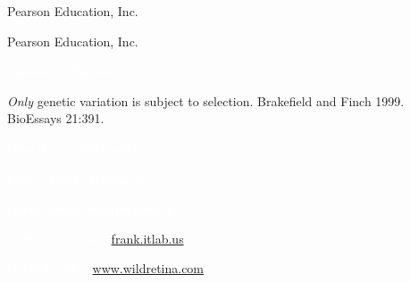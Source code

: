 \documentclass[t]{beamer}
\begin{document}
%
{
\begin{frame}[b]

\tiny\textcopyright Pearson Education, Inc.
\end{frame}
}
%
{
\begin{frame}[b]

\tiny\textcopyright Pearson Education, Inc.
\end{frame}
}
%
%
{
\begin{frame}
\end{frame}
}
%
{
\begin{frame}[plain]
\end{frame}
}

{
\begin{frame}[b,plain]
\hfill\textcolor{white}{\tiny \textcopyright Entomart, Wikimedia}
\end{frame}
}
%
{
\begin{frame}[b,plain]{\textit{Only} genetic variation is subject to selection.}
\hfill\tiny Brakefield and Finch 1999. BioEssays 21:391.
\end{frame}
}
%
{
\begin{frame}[b]
\tiny\textcolor{white}{Silke Baron, Wikimedia }
\end{frame}
}
%
{
\begin{frame}[b]
\hfill\textcolor{white}{\tiny Pierre Dalous, Wikimedia, \ccbysa{}}
\end{frame}
}
%
{
\begin{frame}[b]
\hfill\textcolor{white}{\tiny \textcopyright Dustin Siegel, with permission.}
\end{frame}
}
%
{
\begin{frame}[b]
\hfill\textcolor{white}{\tiny C. Frank Starmer, \href{http://frank.itlab.us}{frank.itlab.us},\ccbyncsa{}}
\end{frame}
}
%
{
\begin{frame}[b]
\hfill\textcolor{white}{\tiny David Carillet, \href{http://www.wildretina.com}{www.wildretina.com}, }
\end{frame}
}
\end{document}
